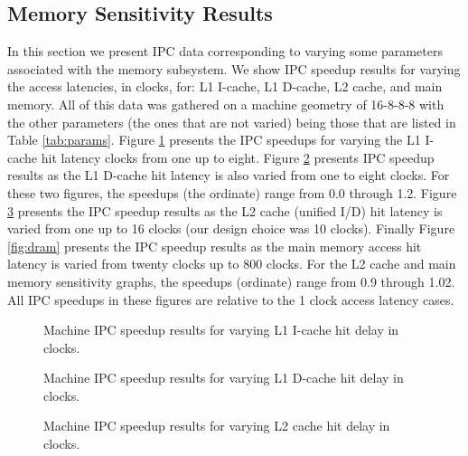 \documentclass[10pt,dvips]{article}
\begin{document}
\subsection{Memory Sensitivity Results}
%
In this section we present IPC data corresponding to varying some
parameters associated with the memory subsystem.
We show IPC speedup results for varying the access latencies,
in clocks, for: L1 I-cache,
L1 D-cache,
L2 cache, and
main memory.
All of this data was gathered on a machine geometry 
of 16-8-8-8 with the other parameters (the ones that are
not varied) being those that are listed in Table \ref{tab:params}.
Figure \ref{fig:l1icache} presents the IPC speedups for varying
the L1 I-cache hit latency clocks from one up to eight.
Figure \ref{fig:l1dcache} presents IPC speedup results
as the L1 D-cache hit latency is also varied from one to eight clocks.
For these two figures, the speedups (the ordinate)
range from 0.0 through 1.2.
Figure \ref{fig:l2cache} presents the IPC speedup results
as the L2 cache (unified I/D) hit latency is varied from 
one up to 16 clocks (our design choice was 10 clocks).
Finally Figure \ref{fig:dram} presents the IPC speedup results
as the main memory access hit latency is varied from twenty clocks 
up to 800 clocks.
For the L2 cache and main memory sensitivity graphs, the speedups
(ordinate) range from 0.9 through 1.02.
All IPC speedups in these figures are relative to the 1 clock
access latency cases.  
%
\begin{figure}
\centering
{}
\caption{Machine IPC speedup results for varying 
L1 I-cache hit delay in clocks.}
\label{fig:l1icache}
\end{figure}
%
\begin{figure}
\centering
{}
\caption{Machine IPC speedup results for varying 
L1 D-cache hit delay in clocks.}
\label{fig:l1dcache}
\end{figure}
%
\begin{figure}
\centering
{}
\caption{Machine IPC speedup results for varying 
L2 cache hit delay in clocks.}
\label{fig:l2cache}
\end{figure}
\end{document}
